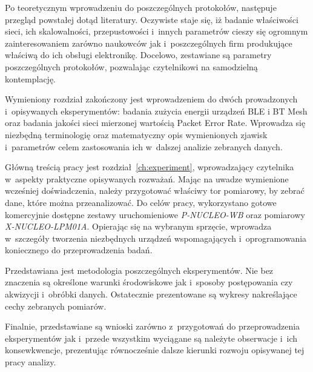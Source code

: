 Po teoretycznym wprowadzeniu do poszczególnych protokołów, następuje przegląd powstałej dotąd
literatury. Oczywiste staje się, iż badanie właściwości sieci, ich skalowalności, przepustowości
i~innych parametrów cieszy się ogromnym zainteresowaniem zarówno naukowców jak i~poszczególnych
firm produkujące właściwą do ich obsługi elektronikę. Docelowo, zestawiane są parametry poszczególnych
protokołów, pozwalając czytelnikowi na samodzielną kontemplację.

Wymieniony rozdział zakończony jest wprowadzeniem do dwóch prowadzonych i~opisywanych eksperymentów:
badania zużycia energii urządzeń BLE i BT Mesh oraz badania jakości sieci mierzonej wartością
Packet Error Rate. Wprowadza się niezbędną terminologię oraz matematyczny opis wymienionych zjawisk
i~parametrów celem zastosowania ich w~dalszej analizie zebranych danych.

Główną treścią pracy jest rozdział~\ref{ch:experiment}, wprowadzający czytelnika w~aspekty praktyczne opisywanych
rozważań. Mając na uwadze wymienione wcześniej doświadczenia, należy przygotować właściwy tor
pomiarowy, by zebrać dane, które można przeanalizować. Do celów pracy, wykorzystano
gotowe komercyjnie dostępne zestawy uruchomieniowe \textit{P-NUCLEO-WB} oraz pomiarowy
\textit{X-NUCLEO-LPM01A}. Opierając się na wybranym sprzęcie, wprowadza w~szczegóły
tworzenia niezbędnych urządzeń wspomagających i~oprogramowania koniecznego
do przeprowadzenia badań.

Przedstawiana jest metodologia poszczególnych eksperymentów. Nie bez znaczenia są określone
warunki środowiskowe jak i~sposoby postępowania czy akwizycji i~obróbki danych. Ostatecznie
prezentowane są wykresy nakreślające cechy zebranych pomiarów.

Finalnie, przedstawiane są wnioski zarówno z~przygotowań do przeprowadzenia eksperymentów
jak i~przede wszystkim wyciągane są należyte obserwacje i~ich konsewkwencje, prezentując równocześnie 
dalsze kierunki rozwoju opisywanej tej pracy analizy.

